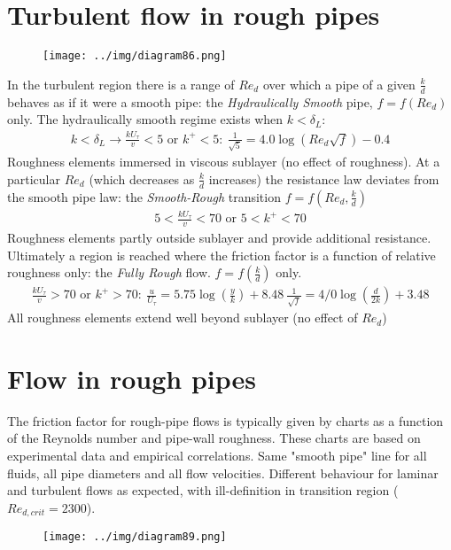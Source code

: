 \documentclass[class=report, crop=false, 12pt,a4paper]{standalone}
\begin{document}
\section{Turbulent flow in rough pipes}
\begin{figure}[H]
  \centering
  \texttt{[image: ../img/diagram86.png]}
  \caption{}
\end{figure}
In the turbulent region there is a range of $Re_d$ over which a pipe of a given $\frac{k}{d}$ behaves as if it were a smooth pipe: the \textit{Hydraulically Smooth} pipe, $f = f\left(Re_d\right)$ only. The hydraulically smooth regime exists when $k < \delta_L$:
\begin{align}
  k < \delta_L \rightarrow \frac{k U_{\tau}}{v} < 5 \textrm{ or } k^+ < 5: \ \frac{1}{\sqrt{5}} = 4.0 \log \left(Re_d \sqrt{f}\right) - 0.4
\end{align}
Roughness elements immersed in viscous sublayer (no effect of roughness). At a particular $Re_d$ (which decreases as $\frac{k}{d}$ increases) the resistance law deviates from the smooth pipe law: the \textit{Smooth-Rough} transition $f = f\left(Re_d, \frac{k}{d}\right)$
\begin{align}
  5 < \frac{k U_{\tau}}{v} < 70 \textrm{ or } 5 < k^+ < 70
\end{align}
Roughness elements partly outside sublayer and provide additional resistance. Ultimately a region is reached where the friction factor is a function of relative roughness only: the \textit{Fully Rough} flow. $f = f\left(\frac{k}{d}\right)$ only.
\begin{align}
  \frac{kU_{\tau}}{v} > 70\textrm{ or } k^+ > 70: \ \frac{u}{U_\tau} = 5.75 \log \left(\frac{y}{k}\right) + 8.48 \ \frac{1}{\sqrt{f}} = 4/0\log \left(\frac{d}{2k}\right) +3.48
\end{align}
All roughness elements extend well beyond sublayer (no effect of $Re_d$)
\section{Flow in rough pipes}
The friction factor for rough-pipe flows is typically given by charts as a function of  the Reynolds number and pipe-wall roughness. These charts are based on experimental data and empirical correlations. Same "smooth pipe" line for all fluids, all pipe diameters and all flow velocities. Different behaviour for laminar and turbulent flows as expected, with ill-definition in transition region ($Re_{d, crit} = 2300$).
\begin{figure}[H]
  \centering
  \texttt{[image: ../img/diagram89.png]}
  \caption{}
\end{figure}
\end{document}
